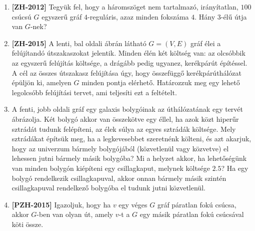 \documentclass[a4paper,12pt]{article}
\begin{document}
\begin{enumerate}
        \item \textbf{[ZH-2012]} Tegyük fel, hogy a háromszöget nem tartalmazó, irányítatlan, $100$ csúcsú $G$ egyszerű gráf $4$-reguláris, azaz minden fokszáma $4$. Hány $3$-élű útja van $G$-nek?
        
        \item \textbf{[ZH-2015]} A lenti, bal oldali ábrán látható $G = (V, E)$ gráf élei a felújítandó útszakaszokat jelentik. Minden élén két költség van: az olcsóbbik az egyszerű felújítás költsége, a drágább pedig ugyanez, kerékpárút építéssel. A cél az összes útszakasz felújítása úgy, hogy összefüggő kerékpárúthálózat épüljön ki, amelyen $G$ minden pontja elérhető. Határozzuk meg egy lehető legolcsóbb felújítási tervet, ami teljesíti ezt a feltételt.
        
        \begin{figure}[h]
            \centering
            \begin{subfigure}{0.45\textwidth}
                \centering
                 \hspace{1in}
            \end{subfigure}
            \begin{subfigure}{0.45\textwidth}
                \centering
                
            \end{subfigure}
        \end{figure}
        
        \item A fenti, jobb oldali gráf egy galaxis bolygóinak az úthálózatának egy tervét ábrázolja. Két bolygó akkor van összekötve egy éllel, ha azok közt hiperűr sztrádát tudunk felépíteni, az élek súlya az egyes sztrádák költsége. Mely sztrádákat építsük meg, ha a legkevesebbet szeretnénk költeni, és azt akarjuk, hogy az univerzum bármely bolygójából (közvetlenül vagy közvetve) el lehessen jutni bármely másik bolygóba? Mi a helyzet akkor, ha lehetőségünk van minden bolygón kiépíteni egy csillagkaput, melynek költsége $2.5$? Ha egy bolygó rendelkezik csillagkapuval, akkor onnan bármely másik szintén csillagkapuval rendelkező bolygóba el tudunk jutni közvetlenül.

        \item \textbf{[PZH-2015]} Igazoljuk, hogy ha $v$ egy véges $G$ gráf páratlan fokú csúcsa, akkor $G$-ben van olyan út, amely $v$-t a $G$ egy másik páratlan fokú csúcsával köti össze.
        

\end{enumerate}
\end{document}
